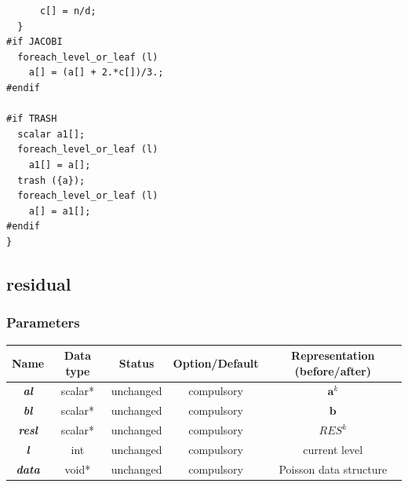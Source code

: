 \documentclass[a4paper]{article}
\newcommand{\func}[1]{\textbf{\textcolor{function}{#1}}}
\newcommand{\para}[1]{\textbf{\emph{\textcolor{para}{#1}}}}
\begin{document}
\begin{multicols}{2}
  \columnbreak
  \begin{verbatim}
      c[] = n/d;
  }
#if JACOBI
  foreach_level_or_leaf (l)
    a[] = (a[] + 2.*c[])/3.;
#endif
  
#if TRASH
  scalar a1[];
  foreach_level_or_leaf (l)
    a1[] = a[];
  trash ({a});
  foreach_level_or_leaf (l)
    a[] = a1[];
#endif
}
  \end{verbatim}
\end{multicols}

\subsection{\func{residual}}
\subsubsection{Parameters}
\begin{center}
  \begin{tabular}{|c|c|c|c|c|}
    \hline
    Name & Data type & Status & Option/Default & Representation (before/after)\\[0.5ex]
    \hline\hline
    \para{al} & scalar* & unchanged & compulsory & $ \mathbf{a}^{k}$\\
    \hline
    \para{bl} & scalar* & unchanged & compulsory & $ \mathbf{b} $\\
    \hline
    \rowcolor{output}\para{resl} & scalar* & unchanged & compulsory & $RES^{k}$\\
    \hline
    \para{l} & int & unchanged & compulsory & current level\\
    \hline
    \para{data} & void* & unchanged & compulsory & Poisson data structure \\
    \hline
  \end{tabular}
\end{center}
\end{document}
